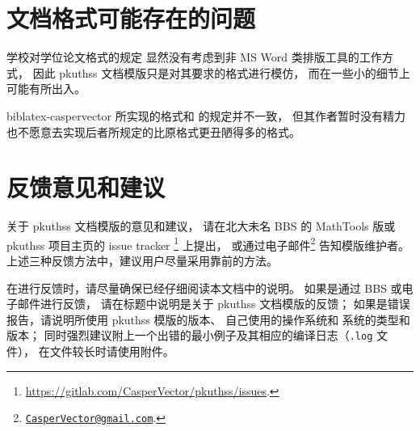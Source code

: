\section{文档格式可能存在的问题}

学校对学位论文格式的规定\mbox{\supercite{pku-thesisstyle}}%
显然没有考虑到非 MS Word 类排版工具的工作方式，
因此 pkuthss 文档模版只是对其要求的格式进行模仿，
而在一些小的细节上可能有所出入。

biblatex-caspervector\supercite{biblatex-caspervector} 所实现的格式和
\parencite{pku-thesisstyle} 的规定并不一致，
但其作者暂时没有精力也不愿意去实现后者所规定的比原格式更丑陋得多的格式。

\section{反馈意见和建议}

关于 pkuthss 文档模版的意见和建议，
请在北大未名 BBS 的 MathTools 版或 pkuthss 项目主页的 issue tracker%
\footnote{\url{https://gitlab.com/CasperVector/pkuthss/issues}.}%
上提出，
或通过电子邮件\footnote%
{\href{mailto:CasperVector@gmail.com}{\texttt{CasperVector@gmail.com}}.}%
告知模版维护者。
上述三种反馈方法中，建议用户尽量采用靠前的方法。

在进行反馈时，请尽量确保已经仔细阅读本文档中的说明。
如果是通过 BBS 或电子邮件进行反馈，
请在标题中说明是关于 pkuthss 文档模版的反馈；
如果是错误报告，请说明所使用 pkuthss 模版的版本、
自己使用的操作系统和  系统的类型和版本；
同时强烈建议附上一个出错的最小例子及其相应的编译日志（\verb|.log| 文件），
在文件较长时请使用附件。

